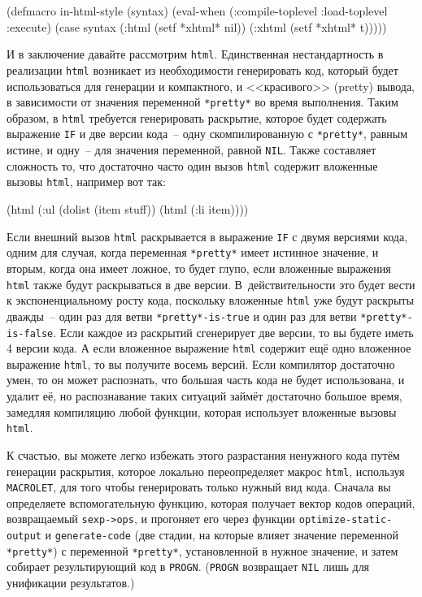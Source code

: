 \begin{myverb}
(defmacro in-html-style (syntax)
  (eval-when (:compile-toplevel :load-toplevel :execute)
    (case syntax
      (:html (setf *xhtml* nil))
      (:xhtml (setf *xhtml* t)))))
\end{myverb}

И в заключение давайте рассмотрим \lstinline{html}.  Единственная нестандартность в реализации
\lstinline{html} возникает из необходимости генерировать код, который будет использоваться для
генерации и компактного, и <<красивого>> (pretty) вывода, в зависимости от значения
переменной \lstinline{*pretty*} во время выполнения.  Таким образом, в \lstinline{html} требуется
генерировать раскрытие, которое будет содержать выражение \lstinline{IF} и две версии кода~--
одну скомпилированную с \lstinline{*pretty*}, равным истине, и одну~-- для значения переменной,
равной \lstinline{NIL}.  Также составляет сложность то, что достаточно часто один вызов
\lstinline{html} содержит вложенные вызовы \lstinline{html}, например вот так:

\begin{myverb}
(html (:ul (dolist (item stuff)) (html (:li item))))
\end{myverb}

Если внешний вызов \lstinline{html} раскрывается в выражение \lstinline{IF} с двумя версиями кода,
одним для случая, когда переменная \lstinline{*pretty*} имеет истинное значение, и вторым,
ког\-да она имеет ложное, то будет глупо, если вложенные выражения \lstinline{html} также будут
раскрываться в две версии.  В~действительности это будет вести к экспоненциальному росту
кода, поскольку вложенные \lstinline{html} уже будут раскрыты дважды~-- один раз для ветви
\lstinline{*pretty*-is-true} и один раз для ветви \lstinline{*pretty*-is-false}.  Если каждое из
раскрытий сгенерирует две версии, то вы будете иметь 4 версии кода.  А если вложенное
выражение \lstinline{html} содержит ещё одно вложенное выражение \lstinline{html}, то вы получите
восемь версий.  Если компилятор достаточно умен, то он может распознать, что большая часть
кода не будет использована, и удалит её, но распознавание таких ситуаций займёт достаточно
большое время, замедляя компиляцию любой функции, которая использует вложенные вызовы
\lstinline{html}.

К счастью, вы можете легко избежать этого разрастания ненужного кода путём генерации
раскрытия, которое локально переопределяет макрос \lstinline{html}, используя \lstinline{MACROLET},
для того чтобы генерировать только нужный вид кода.  Сначала вы определяете
вспомогательную функцию, которая получает вектор кодов операций, возвращаемый
\lstinline{sexp->ops}, и прогоняет его через функции \lstinline{optimize-static-output} и
\lstinline{generate-code} (две стадии, на которые влияет значение переменной \lstinline{*pretty*}) с
переменной \lstinline{*pretty*}, установленной в нужное значение, и затем собирает
результирующий код в \lstinline{PROGN}. (\lstinline{PROGN} возвращает \lstinline{NIL} лишь для унификации
результатов.)

